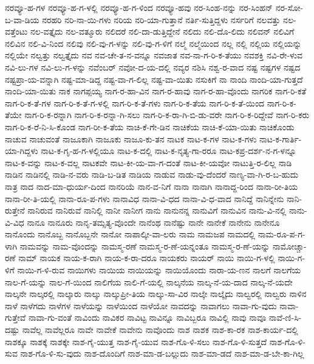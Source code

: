 {ನರವ್ಯೂ-ಹ-ಗಳ
ನರವ್ಯೂ-ಹ-ಗ-ಳಲ್ಲಿ
ನರವ್ಯೂ-ಹ-ಗ-ಳಿಂದ
ನರವ್ಯೂ-ಹವು
ನರ-ಸಿಂಹ-ನನ್ನು
ನರ-ಸಿಂಹನ್
ನರ-ಸೋ-ಬ-ವಾ-ಡಿಯ
ನರಹರಿ
ನರಿ-ನಾ-ಯಿ-ಗಳು
ನರಿಯ
ನರಿ-ಯಾ-ಗುತ್ತಾನೆ
ನರ್ತಿ-ಸುತ್ತಿದ್ದಳು
ನರ್ಸರಿಗೆ
ನಲವತ್ತು
ನಲ-ವತ್ತೆಂಟು
ನಲ-ವತ್ತೈದು
ನಲ-ವತ್ಮೂರು
ನಲಿದರೆ
ನಲಿ-ದಾ-ಡುತ್ತಿದ್ದೇನೆ
ನಲಿದು
ನಲಿ-ದೊ-ಲಿದು
ನಲಿವನ್
ನಲಿವಿಗೆ
ನಲಿವಿನ
ನಲಿ-ವಿ-ನಿಂದ
ನಲಿವು
ನಲಿ-ವು-ಗ-ಳನ್ನು
ನಲಿ-ವು-ಗ-ಳಿಗೆ
ನಲ್ಮೆ
ನಲ್ಮೆಯಿಂದ
ನಲ್ಲ
ನಲ್ಲಿ
ನಲ್ಲಿಯ
ನಲ್ಲಿಯನ್ನು
ನಲ್ಲಿಯೇ
ನಲ್ವತ್ತು
ನಲ್ವತ್ತೈದು
ನವ
ನವ-ಚೇ-ತ-ನ-ವನ್ನೂ
ನವಜಾತ
ನವ-ನಾ-ಗ-ರಿ-ಕ-ತೆಯು
ನವಶಕ್ತಿ
ನವಿ-ರೇ-ಳುವ
ನವಿ-ಲು-ಗಳ
ನವಿ-ಲು-ಗ-ಳನ್ನು
ನವೆಂಬರ್
ನವೋ-ದ-ಯ-ದಲ್ಲಿ
ನವ್ಯರ
ನಶಿಸಿ
ನಶ್ವ-ರ-ವಾದ
ನಷ್ಟ
ನಷ್ಟಗಳ
ನಷ್ಟದ
ನಷ್ಟಪ್ರಾ-ಯ-ವನ್ನಾಗಿ
ನಷ್ಟ-ಮಾ-ಡಿದ್ದ
ನಷ್ಟ-ವಾ-ಗ-ಲಿಲ್ಲ
ನಷ್ಟ-ವಾ-ಯಿತು
ನಸುಕಿಗೆ
ನಾ
ನಾಂದಿ
ನಾಂದಿ-ಯಾ-ಗುತ್ತದೆ
ನಾಂದಿ-ಯಾ-ಯಿತು
ನಾಕ
ನಾಗಪ್ಪಯ್ಯ
ನಾಗ-ರ-ಹಾ-ವಿನ
ನಾಗ-ರ-ಹಾವು
ನಾಗ-ರ-ಹಾ-ವೊಂದು
ನಾಗರಿಕ
ನಾಗ-ರಿ-ಕತೆ
ನಾಗ-ರಿ-ಕ-ತೆ-ಗಳ
ನಾಗ-ರಿ-ಕ-ತೆ-ಗ-ಳಲ್ಲಿ
ನಾಗ-ರಿ-ಕ-ತೆ-ಗಳು
ನಾಗ-ರಿ-ಕ-ತೆಯ
ನಾಗ-ರಿ-ಕ-ತೆ-ಯಿಂದ
ನಾಗ-ರಿ-ಕ-ತೆಯೇ
ನಾಗ-ರಿ-ಕ-ರನ್ನಾಗಿ
ನಾಗ-ರಿ-ಕ-ರನ್ನಾ-ಗಿ-ಸಲು
ನಾಗ-ರಿ-ಕ-ರಾ-ಗಿ-ಬಿ-ಡು-ವರೇ
ನಾಗ-ರಿ-ಕ-ರಿದ್ದೇವೆ
ನಾಗ-ರಿ-ಕರು
ನಾಗ-ರಿ-ಕ-ರೆ-ನಿ-ಸಿ-ಕೊಂಡ
ನಾಗ-ರೀ-ಕ-ತೆಯ
ನಾಚಿ-ಕೆ-ಗೇ-ಡಿನ
ನಾಚಿಕೆಯ
ನಾಚಿ-ಕೆ-ಯಾ-ಯಿತು
ನಾಚಿಕೊಂಡು
ನಾಚುವ
ನಾಚುವಂತೆ
ನಾಜೂಕಾಗಿ
ನಾಜೂಕು
ನಾಜೂ-ಕು-ತನ
ನಾಟಕ
ನಾಟ-ಕ-ಗಳ
ನಾಟ-ಕ-ಗಳು
ನಾಟ-ಕ-ಗಾರ್ತಿ-ಯಾ-ಗಿದ್ದಳು
ನಾಟ-ಕ-ಗೃ-ಹ-ಗ-ಳಲ್ಲಿಯೂ
ನಾಟ-ಕ-ದಲ್ಲಿ
ನಾಟ-ಕ-ನೃತ್ಯ-ಗಾ-ರರೂ
ನಾಟ-ಕಪ್ರ-ದರ್ಶ-ನ-ಗ-ಳನ್ನೂ
ನಾಟ-ಕ-ವನ್ನು
ನಾಟ-ಕ-ವಲ್ಲ
ನಾಟಕವೇ
ನಾಟ-ಕೀ-ಯ-ವಾ-ಗ-ದಂತೆ
ನಾಟ-ಕೀ-ಯವೋ
ನಾಟುತ್ತಿ-ರ-ಲಿಲ್ಲ
ನಾಡಿ
ನಾಡಿನ
ನಾಡಿನಲ್ಲಿ
ನಾಡಿ-ನ-ವರು
ನಾಡಿ-ಬ-ಡಿತ
ನಾಡಿಯ
ನಾಡುವ
ನಾಡು-ವು-ದೆಂದರೆ
ನಾಣ್ಯ-ವಾ-ಗಿ-ರ-ಬ-ಹುದು
ನಾತ್ರ
ನಾದ
ನಾದ-ಮಾ-ಧುರ್ಯ-ದಿಂದ
ನಾನರಿಯೆ
ನಾನ-ವ-ನಿಗೆ
ನಾನಾ
ನಾನಾಗಿ
ನಾನಾದ್ದ-ರಿಂದ
ನಾನಾ-ರೀ-ತಿಯ
ನಾನಾ-ರೀ-ತಿ-ಯಲ್ಲಿ
ನಾನಾ-ರೂ-ಪ-ಗಳು
ನಾನಾವಿಧ
ನಾನಾ-ವಿ-ಧದ
ನಾನಾ-ವಿ-ಧ-ವಾದ
ನಾನಿದ್ದೆ
ನಾನಿನ್ನೇನು
ನಾನಿ-ರುತ್ತೇನೆ
ನಾನಿರುವ
ನಾನಿರುವೆ
ನಾನಿಲ್ಲಿ
ನಾನೀ
ನಾನೀಗ
ನಾನು
ನಾನುನನ್ನ
ನಾನುವಿಗೆ
ನಾನುವಿನ
ನಾನು-ವಿ-ನಲ್ಲಿ
ನಾನು-ವಿ-ವಿಧ
ನಾನೂ
ನಾನೂರು
ನಾನೃ-ತಮ್ಸತ್ಯ-ವೊಂದೇ
ನಾನೆಂಥ
ನಾನೆಷ್ಟು
ನಾನೇ
ನಾನೇಕೆ
ನಾನೇನು
ನಾನೇನೂ
ನಾನೊಂದು
ನಾನೊಬ್ಬ
ನಾನೊಬ್ಬನೇ
ನಾನೋ
ನಾಪಾಲ್ಕೀ-ವಾ-ಲರು
ನಾಮ
ನಾಮಜಪ
ನಾಮದಲ್ಲಿ
ನಾಮ-ರೂ-ಪ-ಗ-ಳಾಗಿ
ನಾಮವನ್ನು
ನಾಮ-ವೊಂದನ್ನು
ನಾಮಸ್ಮ-ರಣೆ
ನಾಮಸ್ಮ-ರ-ಣೆ-ಯನ್ನಂತೂ
ನಾಮಸ್ಮ-ರ-ಣೆ-ಯನ್ನು
ನಾಮೋಚ್ಚಾ-ರಣೆ
ನಾಮ್
ನಾಯಕ
ನಾಯ-ಕ-ರಾಗಿ
ನಾಯ-ಕ-ರಾ-ದರೂ
ನಾಯಕರು
ನಾಯರ್
ನಾಯಿ
ನಾಯಿ-ಗ-ಳಲ್ಲಿ
ನಾಯಿ-ಗ-ಳಿಗೆ
ನಾಯಿ-ಗ-ಳಿ-ರುವ
ನಾಯಿಗಳು
ನಾಯಿಯ
ನಾಯಿಯನ್ನು
ನಾಯಿಯೊಂದು
ನಾರಾ-ಯ-ಣನ
ನಾಲಗೆ
ನಾಲಗೆಯ
ನಾಲ-ಗೆ-ಯನ್ನು
ನಾಲ-ಗೆ-ಯಿಂದ
ನಾಲಿಗೆಯ
ನಾಲಿ-ಗೆ-ಯಲ್ಲಿ
ನಾಲ್ಕನೆಯ
ನಾಲ್ಕ-ನೆ-ಯ-ದಾದ
ನಾಲ್ಕ-ನೆ-ಯದೇ
ನಾಲ್ಕನೇ
ನಾಲ್ಕರಲ್ಲಿ
ನಾಲ್ಕಾರು
ನಾಲ್ಕು
ನಾಲ್ಕುಪ್ರೀ-ತಿಯ
ನಾಲ್ಕು-ಸಾ-ವಿರ
ನಾಲ್ಕೇ
ನಾಲ್ಕೈದು
ನಾಲ್ವರಲ್ಲಿ
ನಾಲ್ವರು
ನಾಳಿನ
ನಾಳೆ
ನಾಳೆಗದು
ನಾಳೆಗಳ
ನಾಳೆಯನ್ನು
ನಾಳೆಯಿಂದ
ನಾಳೆಯೋ
ನಾವದನ್ನು
ನಾವಾಗಲು
ನಾವಾ-ಗು-ವುದು
ನಾವಾ-ಗುತ್ತೇವೆ
ನಾವಾ-ಗು-ವಂತೆ
ನಾವಿಂದು
ನಾವಿಕರ
ನಾವಿಟ್ಟ
ನಾವಿನ್ನೂ
ನಾವಿಬ್ಬರೂ
ನಾವಿಲ್ಲಿ
ನಾವು
ನಾವೂ
ನಾವೆ-ಣಿ-ಸಿ-ದಷ್ಟು
ನಾವೆಲ್ಲ
ನಾವೆಲ್ಲರೂ
ನಾವೇ
ನಾವೇಕೆ
ನಾವೇನು
ನಾವೊಂದು
ನಾಶ
ನಾಶಕ
ನಾಶ-ಕಾ-ರಕ
ನಾಶ-ಕಾರ್ಯ-ದಲ್ಲಿ
ನಾಶಕ್ಕೂ
ನಾಶಕ್ಕೆ
ನಾಶಕ್ಕೇ
ನಾಶ-ಗೈ-ಯುತ್ತ
ನಾಶ-ಗೈ-ಯುವ
ನಾಶ-ಗೊ-ಳಿ-ಸಲು
ನಾಶ-ಗೊ-ಳಿ-ಸುತ್ತದೆ
ನಾಶ-ಗೊ-ಳಿ-ಸುವ
ನಾಶ-ಗೊ-ಳಿ-ಸು-ವುದು
ನಾಶ-ದೊಂದಿಗೆ
ನಾಶ-ಮಾ-ಡ-ಬಲ್ಲುದು
ನಾಶ-ಮಾ-ಡದೆ
ನಾಶ-ಮಾ-ಡ-ಬೇ-ಕಾ-ಗಿಲ್ಲ
}
